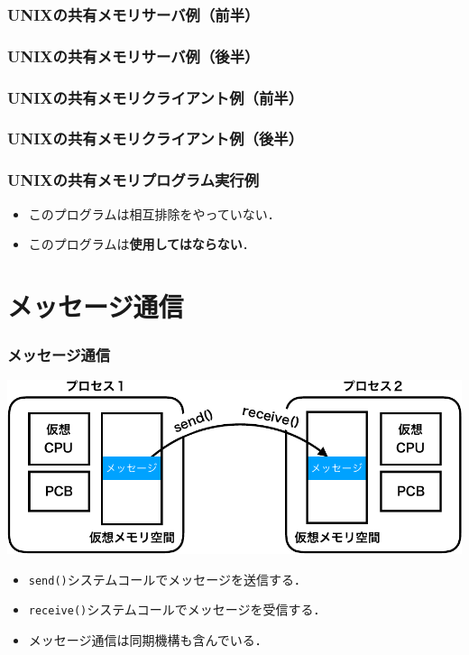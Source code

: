 \documentclass{beamer}                   %
\begin{document}
\begin{frame}
  \frametitle{UNIXの共有メモリサーバ例（前半）}
  
\end{frame}

\begin{frame}
  \frametitle{UNIXの共有メモリサーバ例（後半）}
  
\end{frame}

\begin{frame}
  \frametitle{UNIXの共有メモリクライアント例（前半）}
  
\end{frame}

\begin{frame}
  \frametitle{UNIXの共有メモリクライアント例（後半）}
  
\end{frame}

\begin{frame}
  \frametitle{UNIXの共有メモリプログラム実行例}
  
  \begin{itemize}
  \item このプログラムは相互排除をやっていない．
  \item このプログラムは{\bf 使用してはならない}．
  \end{itemize}
\end{frame}

\section{メッセージ通信}
\begin{frame}
  \frametitle{メッセージ通信}
  \begin{center}
    \includegraphics[scale=0.6]{Fig/ipcMessagePassing-crop.pdf}
  \end{center}
  \begin{itemize}
  \item {\tt send()}システムコールでメッセージを送信する．
  \item {\tt receive()}システムコールでメッセージを受信する．
  \item メッセージ通信は同期機構も含んでいる．
  \end{itemize}
\end{frame}
\end{document}

